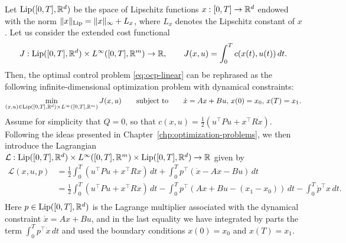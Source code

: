 Let $\operatorname{Lip}([0,T], \mathbb{R}^d)$ be the space of Lipschitz functions $x:[0,T]\to \mathbb{R}^d$ endowed with the norm $\|x\|_{\operatorname{Lip}}=\|x\|_\infty + L_x$, where $L_x$ denotes the Lipschitz constant of $x$. 
Let us consider the extended cost functional 
\begin{equation}
    J: \operatorname{Lip}([0,T],\mathbb{R}^d) \times L^\infty([0,T],\mathbb{R}^m) \to \mathbb{R}, \qquad
    J(x,u) = \int_0^T c(x(t),u(t))\, dt.
\end{equation}
Then, the optimal control problem \eqref{eq:ocp-linear} can be rephrased as the following infinite-dimensional optimization problem with dynamical constraints:
\begin{equation}
    \min_{(x,u) \in \operatorname{Lip}([0,T],\mathbb{R}^d) \times L^\infty([0,T],\mathbb{R}^m)} J(x,u) \qquad\text{subject to}\qquad \dot x = Ax + Bu,\, x(0)=x_0,\, x(T)=x_1.
\end{equation}
Assume for simplicity that $Q=0$, so that $c(x,u)=\frac12\left(u^\top P u + x^\top Rx\right)$.
Following the ideas presented in Chapter~\ref{chp:optimization-problems}, we then introduce the Lagrangian $\mathcal L:\operatorname{Lip}([0,T],\mathbb{R}^d) \times L^\infty([0,T],\mathbb{R}^m) \times \operatorname{Lip}([0,T],\mathbb{R}^d) \to \mathbb{R}$ given by
\begin{equation}
    \begin{split}
        \mathcal L (x,u, p)
         & =  \frac12\int_0^T \left(u^\top P u + x^\top Rx\right)\,dt + \int_0^T p^\top \left(\dot x - Ax-Bu\right)\, dt                                \\
         & =  \frac12\int_0^T \left(u^\top P u + x^\top Rx\right)\,dt - \int_0^T p^\top \left(Ax+Bu-(x_1-x_0)\right)\, dt -\int_0^T \dot p^\top x\, dt. \\
    \end{split}
    \end{equation}
Here $p\in \operatorname{Lip}([0,T],\mathbb{R}^d)$ is the Lagrange multiplier associated with the dynamical constraint $\dot x = Ax + Bu$, and in the last equality we have integrated by parts the term $\int_0^T p^\top \dot x\, dt$ and used the boundary conditions $x(0)=x_0$ and $x(T)=x_1$.

